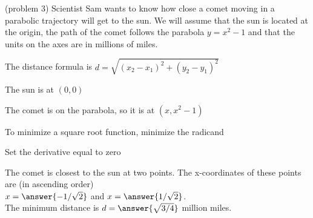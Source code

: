 \documentclass{ximera}
\begin{document}
\begin{problem}(problem 3)
Scientist Sam wants to know how close a comet moving in a parabolic trajectory will get to the sun. 
We will assume that the sun is located at the origin, 
the path of the comet follows the parabola $y = x^2 - 1$ and that the units 
on the axes are in millions of miles.



\begin{hint}
The distance formula is $d = \sqrt{(x_2 - x_1)^2 + (y_2 - y_1)^2}$
\end{hint}
\begin{hint}
The sun is at $(0,0)$
\end{hint}
\begin{hint}
The comet is on the parabola, so it is at $(x, x^2 - 1)$
\end{hint}
\begin{hint}
To minimize a square root function, minimize the radicand
\end{hint}
\begin{hint}
Set the derivative equal to zero
\end{hint}

The comet is closest to the sun at two points.
 The x-coordinates of these points are (in ascending order)\\
$x =  \answer{-1/\sqrt2}$ and $x = \answer{1/\sqrt2}$.\\
The minimum distance is $d = \answer{\sqrt{3/4}}$ million miles.
\end{problem}
\end{document}

